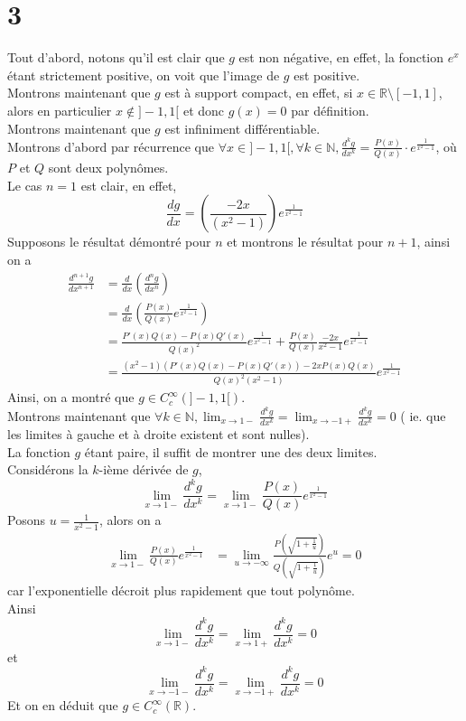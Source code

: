 \documentclass[11pt, a4paper]{article}
\begin{document}
\section*{3}
Tout d'abord, notons qu'il est clair que $g$ est non négative, en effet, la fonction $ e^{x} $ étant strictement positive, on voit que l'image de $g$ est positive.\\
Montrons maintenant que $g$ est à support compact, en effet, si $x \in \mathbb{R} \setminus [ -1,1] $, alors en particulier $x \notin ]-1,1[$ et donc $g( x) =0$ par définition.\\
Montrons maintenant que $g$ est infiniment différentiable.\\
Montrons d'abord par récurrence que $ \forall x \in ]-1,1[,\forall k \in \mathbb{N}, \frac{d^{k}g}{dx^{k}} = \frac{P( x) }{Q( x) }	 \cdot e^{\frac{1}{x^2-1}}  $, où $P$ et $Q$ sont deux polynômes. \\
Le cas $n=1$ est clair, en effet,
\[ 
	\frac{dg}{dx}= \left( \frac{-2x}{( x^2-1) }\right) e^{\frac{1}{x^2-1}} 
\]
Supposons le résultat démontré pour $n$ et montrons le résultat pour $n+1$, ainsi on a
\begin{align*}
	\frac{d^{n+1}g}{dx^{n+1}} &= \frac{d}{dx} \left( \frac{d^{n}g}{dx^{n}}\right) \\
				  &= \frac{d}{dx} \left( \frac{P( x) }{Q( x) } e^{\frac{1}{x^2-1}}  \right) \\
				  &= \frac{P'( x) Q( x) - P( x) Q'( x) }{Q( x) ^{2}} e^{\frac{1}{x^{2}-1}} + \frac{P( x) }{Q( x) } \frac{-2x}{x^{2}-1} e^{\frac{1}{x^{2}-1}} \\
				  &= \frac{( x^{2}-1 )( P'(x ) Q( x) - P( x) Q'( x) ) -2x P( x)Q( x) }{Q( x) ^{2}( x^{2}-1) } e^{\frac{1}{x^{2}-1}} 
\end{align*}
Ainsi, on a montré que $g \in C^{ \infty }_c ( ]-1,1[) $.\\
Montrons maintenant que $ \forall k \in \mathbb{N}, \lim_{x \to 1 -} \frac{d^{k}g}{dx^{k}}= \lim_{x \to -1 +} \frac{d^{k}g}{dx^{k}} = 0 $ ( ie. que les limites à gauche et à droite existent et sont nulles).\\
La fonction $g$ étant paire, il suffit de montrer une des deux limites.\\
Considérons la $k$-ième dérivée de $g$, 
\[ 
	\lim_{x \to 1-} \frac{d^{k}g}{dx^{k}} = \lim_{x \to 1-} \frac{P( x) }{Q( x) } e^{ \frac{1}{x^{2}-1	}} 
\]
Posons $u= \frac{1}{x^{2}-1}$, alors on a
\begin{align*}
	\lim_{x \to 1-} \frac{P( x) }{Q( x) } e^{ \frac{1}{x^{2}-1}} &= \lim_{u \to - \infty } \frac{P( \sqrt{1 + \frac{1}{u}} ) }{Q( \sqrt{1+ \frac{1}{u}} ) } e^{u}  = 0
\end{align*}
car l'exponentielle décroit plus rapidement que tout polynôme.\\
Ainsi
\[ 
	\lim_{x \to 1-} \frac{d^{k}g}{dx^{k}} = \lim_{x \to 1+} \frac{d^{k}g}{dx^{k}}= 0
\]
et
\[ 
	\lim_{x \to -1-} \frac{d^{k}g}{dx^{k}} = \lim_{x \to -1+} \frac{d^{k}g}{dx^{k}}= 0
\]
Et on en déduit que $g \in C^{ \infty }_c ( \mathbb{R}) $.





 
\end{document}
